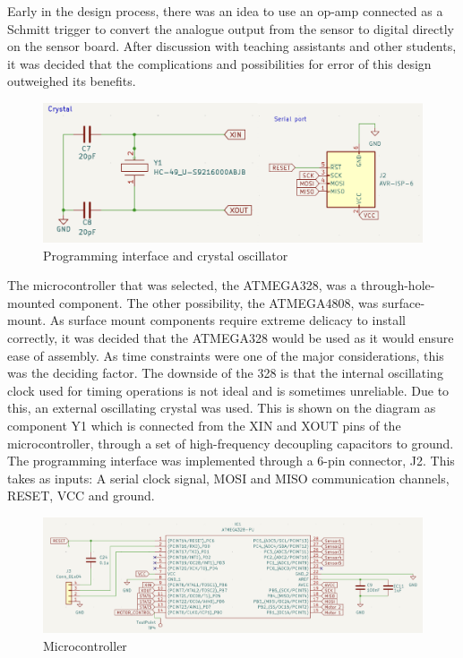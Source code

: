 Early in the design process, there was an idea to use an op-amp connected as a Schmitt trigger to convert the analogue output from the sensor to digital directly on the sensor board. After discussion with teaching assistants and other students, it was decided that the complications and possibilities for error of this design outweighed its benefits. 

 

\begin{figure}[H]
    \centering
    \includegraphics[width=0.7\linewidth]{REPORT/Crystal.png}
    \caption{Programming interface and crystal oscillator}
    \label{fig:Crystal}
\end{figure}

The microcontroller that was selected, the ATMEGA328, was a through-hole-mounted component. The other possibility, the ATMEGA4808, was surface-mount. As surface mount components require extreme delicacy to install correctly, it was decided that the ATMEGA328 would be used as it would ensure ease of assembly. As time constraints were one of the major considerations, this was the deciding factor. The downside of the 328 is that the internal oscillating clock used for timing operations is not ideal and is sometimes unreliable. Due to this, an external oscillating crystal was used. This is shown on the diagram as component Y1 which is connected from the XIN and XOUT pins of the microcontroller, through a set of high-frequency decoupling capacitors to ground. 
\\

The programming interface was implemented through a 6-pin connector, J2. This takes as inputs: A serial clock signal, MOSI and MISO communication channels, RESET, VCC and ground. 

\begin{figure}[H]
    \centering
    \includegraphics[width=0.83\linewidth]{REPORT/MicroCon.png}
    \caption{Microcontroller}
    \label{fig:Microcontroller}
\end{figure}

